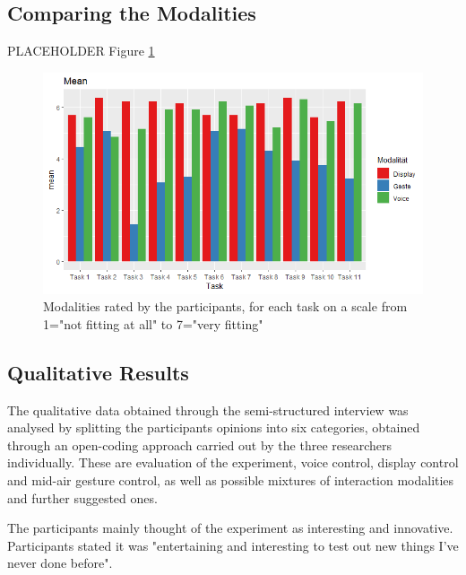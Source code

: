 \documentclass[sigchi]{acmart}
\begin{document}
	\subsection{Comparing the Modalities}
	PLACEHOLDER Figure \ref{figure:ModalityRating}
	\begin{figure}			
		\centering
		\includegraphics[width=\columnwidth]{MeanGesamt}
		\caption{Modalities rated by the participants, for each task on a scale from 1="not fitting at all" to 7="very fitting"}
		\label{figure:ModalityRating}
	\end{figure}
	
	\subsection{Qualitative Results}
	The qualitative data obtained through the semi-structured interview was analysed by splitting the participants opinions into six categories, obtained through an open-coding approach carried out by the three researchers individually. These are evaluation of the experiment, voice control, display control and mid-air gesture control, as well as possible mixtures of interaction modalities and further suggested ones. 
	
	The participants mainly thought of the experiment as interesting and innovative. Participants stated it was "entertaining and interesting to test out new things I've never done before". 
	
\end{document}
